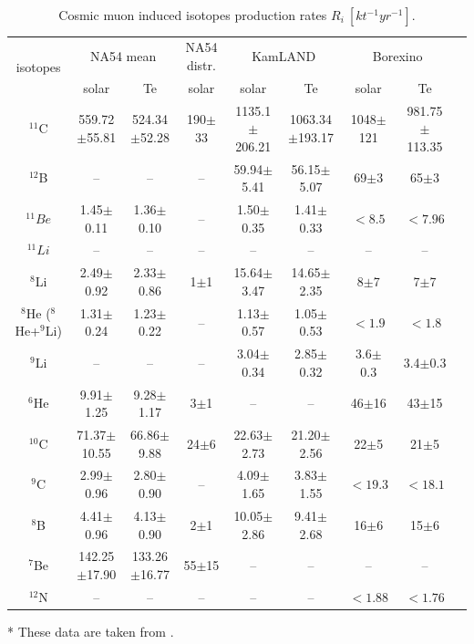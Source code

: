 \begin{table}[ht]
	\caption{Cosmic muon induced isotopes production rates $R_i~[kt^{-1}yr^{−1}]$.}\label{estimateRates}
	\centering
	\scriptsize
	\begin{tabular*}{170mm}{c@{\extracolsep{\fill}}cccccccc}
		\toprule 
		\multirow{2}{*}{isotopes} &\multicolumn{2}{c}{NA54 mean}& NA54 distr.& \multicolumn{2}{c}{KamLAND}& \multicolumn{2}{c}{Borexino}\\
		\cline{2-3}   \cline{5-6} \cline{7-8}
		& solar & Te & solar  & solar & Te & solar & Te\\
		\midrule
		$^{11}$C &559.72$\pm$55.81 &524.34$\pm$52.28 &190$\pm$33 &1135.1$\pm$206.21 &1063.34$\pm$193.17& 1048$\pm$121 &981.75$\pm$113.35\\
		$^{12}$B & -- & -- & -- & 59.94$\pm$5.41& 56.15$\pm$5.07 &69$\pm$3 &65$\pm$3\\
		$^{11}Be$&  1.45$\pm$0.11& 1.36$\pm$0.10& -- &1.50$\pm$0.35 &1.41$\pm$0.33& $<8.5$ & $<7.96$ \\
                $^{11}Li$ & -- & -- & -- & -- & -- & -- & --\\
		$^8$Li & 2.49$\pm$0.92 & 2.33$\pm$0.86 & 1$\pm$1 & 15.64$\pm$3.47 & 14.65$\pm$2.35 & 8$\pm$7 & 7$\pm$7\\
		$^8$He ($^8$He+$^9$Li) & 1.31$\pm$0.24 & 1.23$\pm$0.22 & -- & 1.13$\pm$0.57 & 1.05$\pm$0.53 & $<1.9$ & $<1.8$\\
		$^9$Li & --&  --&  --&  3.04$\pm$0.34 & 2.85$\pm$0.32 & 3.6$\pm$0.3 & 3.4$\pm$0.3\\
        $^6$He & 9.91$\pm$1.25 & 9.28$\pm$1.17 & 3$\pm$1 &-- &-- &46$\pm$16 & 43$\pm$15\\
		$^{10}$C & 71.37$\pm$10.55 & 66.86$\pm$9.88 & 24$\pm$6 & 22.63$\pm$2.73 & 21.20$\pm$2.56 & 22$\pm$5 & 21$\pm$5\\
        $^9$C & 2.99$\pm$0.96 & 2.80$\pm$0.90 & -- & 4.09$\pm$1.65 & 3.83$\pm$1.55 & $<19.3$ & $<18.1$\\
        $^8$B & 4.41$\pm$0.96 & 4.13$\pm$0.90 & 2$\pm$1 & 10.05$\pm$2.86 & 9.41$\pm$2.68 & 16$\pm$6 & 15$\pm$6\\
		$^7$Be &142.25$\pm$17.90 & 133.26$\pm$16.77 & 55$\pm$15 & -- & -- & -- & --\\
		$^{12}$N & -- &--& --& --& --& $<1.88$ & $<1.76$\\
		\bottomrule
	\end{tabular*}
\end{table}
* These data are taken from \cite{nndc}.

